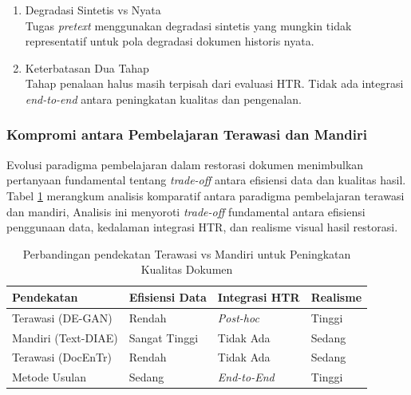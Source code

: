 \begin{enumerate}[leftmargin=*, labelindent=0pt, itemsep=1ex, topsep=0pt]
\begin{enumerate}[leftmargin=1.5em, labelsep=0.5em, itemindent=0pt, label=\alph*., topsep=0pt, parsep=0pt, itemsep=0pt]
      \item Degradasi Sintetis vs Nyata \mbox{}\\[0.1em]
            Tugas \textit{pretext} menggunakan degradasi sintetis yang mungkin tidak representatif untuk pola degradasi dokumen historis nyata.

      \item Keterbatasan Dua Tahap \mbox{}\\[0.1em]
            Tahap penalaan halus masih terpisah dari evaluasi HTR. Tidak ada integrasi \textit{end-to-end} antara peningkatan kualitas dan pengenalan.
\end{enumerate}

\end{enumerate}

\subsubsection{Kompromi antara Pembelajaran Terawasi dan Mandiri}

Evolusi paradigma pembelajaran dalam restorasi dokumen menimbulkan pertanyaan fundamental tentang \textit{trade-off} antara efisiensi data dan kualitas hasil. Tabel \ref{tab:supervised-selfsupervised} merangkum analisis komparatif antara paradigma pembelajaran terawasi dan mandiri, Analisis ini menyoroti \textit{trade-off} fundamental antara efisiensi penggunaan data, kedalaman integrasi HTR, dan realisme visual hasil restorasi.

\begin{table}[htbp]
      \centering
      \caption[Perbandingan Pendekatan Terawasi vs Mandiri]{Perbandingan pendekatan Terawasi vs Mandiri untuk Peningkatan Kualitas Dokumen}
      \label{tab:supervised-selfsupervised}
      \small
      \begin{tabularx}{\textwidth}{|>{\raggedright\arraybackslash}X|>{\centering\arraybackslash}p{2cm}|>{\centering\arraybackslash}p{2cm}|>{\centering\arraybackslash}p{1.8cm}|}
            \hline
            \textbf{Pendekatan} & \textbf{Efisiensi Data} & \textbf{Integrasi HTR} & \textbf{Realisme} \\ \hline
            Terawasi (DE-GAN)         & Rendah                  & \textit{Post-hoc}               & Tinggi           \\ \hline
            Mandiri (Text-DIAE) & Sangat Tinggi           & Tidak Ada              & Sedang           \\ \hline
            Terawasi (DocEnTr)        & Rendah                  & Tidak Ada              & Sedang           \\ \hline
            Metode Usulan              & Sedang                  & \textit{End-to-End}         & Tinggi           \\ \hline
      \end{tabularx}
\end{table}

